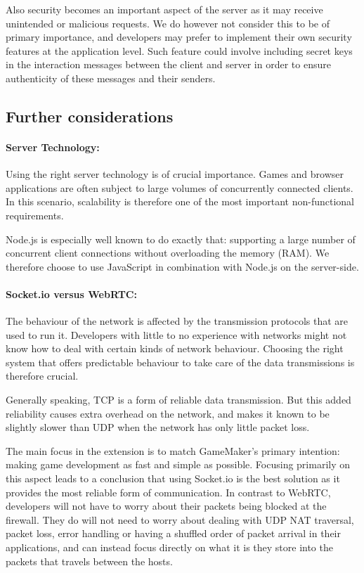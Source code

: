 \documentclass[bsc, 12pt, twoside, singlespacing, parskip, abbrevs, notimes, normalheadings, logo, deptreport]{styles/infthesis}
\begin{document}
Also security becomes an important aspect of the server as it may receive unintended or malicious requests. We do however not consider this to be of primary importance, and developers may prefer to implement their own security features at the application level. Such feature could involve including secret keys in the interaction messages between the client and server in order to ensure authenticity of these messages and their senders.


\subsection{Further considerations}
\paragraph*{Server Technology:}
Using the right server technology is of crucial importance. Games and browser applications are often subject to large volumes of concurrently connected clients. In this scenario, scalability is therefore one of the most important non-functional requirements. 

Node.js is especially well known to do exactly that: supporting a large number of concurrent client connections without overloading the memory (RAM). We therefore choose to use JavaScript in combination with Node.js on the server-side.

\paragraph*{Socket.io versus WebRTC:}
The behaviour of the network is affected by the transmission protocols that are used to run it. Developers with little to no experience with networks might not know how to deal with certain kinds of network behaviour. Choosing the right system that offers predictable behaviour to take care of the data transmissions is therefore crucial.
 
Generally speaking, TCP is a form of reliable data transmission. But this added reliability causes extra overhead on the network, and makes it known to be slightly slower than UDP when the network has only little packet loss.

The main focus in the extension is to match GameMaker's primary intention: making game development as fast and simple as possible. Focusing primarily on this aspect leads to a conclusion that using Socket.io is the best solution as it provides the most reliable form of communication. In contrast to WebRTC, developers will not have to worry about their packets being blocked at the firewall. They do will not need to worry about dealing with UDP NAT traversal, packet loss, error handling or having a shuffled order of packet arrival in their applications, and can instead focus directly on what it is they store into the packets that travels between the hosts.
\end{document}

